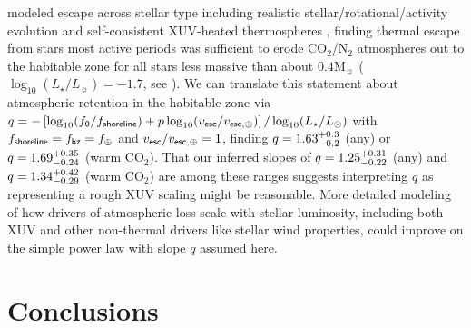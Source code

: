 \documentclass[modern,linenumbers,trackchanges]{aastex7}
\begin{document}
\citet{vanlooverenHabitableZoneAtmosphere2025} modeled escape across stellar type including realistic stellar/rotational/activity evolution and self-consistent XUV-heated thermospheres \citep{johnstoneUpperAtmospheresTerrestrial2018}, finding thermal escape from stars most active periods was sufficient to erode CO$_2$/N$_2$ atmospheres out to the habitable zone for all stars less massive than about $0.4 \mathrm{M_\sun}$ ($\log_{10} (L_\star/L_\sun) =-1.7$, see \citealt{pinedaMdwarfUltravioletSpectroscopic2021}). We can translate this statement about atmospheric retention in the habitable zone via $q = - \left[\log_{10} (f_{\sf 0}/f_{\sf shoreline}) + p \log_{10} (v_{\sf esc}/v_{\sf esc, \oplus})\right]/\log_{10} (L_\star/L_\odot)$ with $f_{\sf shoreline} = f_{\sf hz} = f_{\oplus}$ and $v_{\sf esc}/v_{\sf esc, \oplus}=1$, finding $q = 1.63_{-0.2}^{+0.3}$ (any) or $q = 1.69_{-0.24}^{+0.35}$ (warm CO$_2$). That our inferred slopes of $q = 1.25_{-0.22}^{+0.31}$ (any) and $q = 1.34_{-0.29}^{+0.42}$ (warm CO$_2$) are among these ranges suggests interpreting $q$ as representing a rough XUV scaling might be reasonable. More detailed modeling of how drivers of atmospheric loss scale with stellar luminosity, including both XUV and other non-thermal drivers like stellar wind properties, could improve on the simple power law with slope $q$ assumed here.

\section{Conclusions}
\label{s:conclusions}
\end{document}
